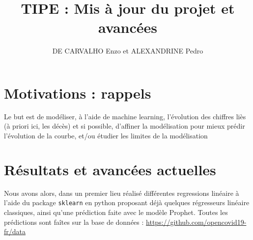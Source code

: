 \documentclass[a4paper,11pt]{article}
\date{}
\title{TIPE : Mis à jour du projet et avancées}
\author{DE CARVALHO Enzo et ALEXANDRINE Pedro}
\begin{document}
\maketitle
\section{Motivations : rappels}
	Le but est de modéliser, à l'aide de machine learning, l'évolution des 
	chiffres liès (à priori ici, les décès) et si possible, d'affiner la 			modélisation pour mieux prédir l'évolution de la courbe, et/ou étudier 			les limites de la modélisation

\section{Résultats et avancées actuelles}
	Nous avons alors, dans un premier lieu réalisé différentes regressions
	linéaire à l'aide du package \texttt{sklearn} en python proposant déjà
	quelques régresseurs linéaire classiques, ainsi qu'une prédiction
	faite avec le modèle Prophet.
	Toutes les prédictions sont faîtes sur la base de données :
	\url{https://github.com/opencovid19-fr/data}\\
\end{document}
